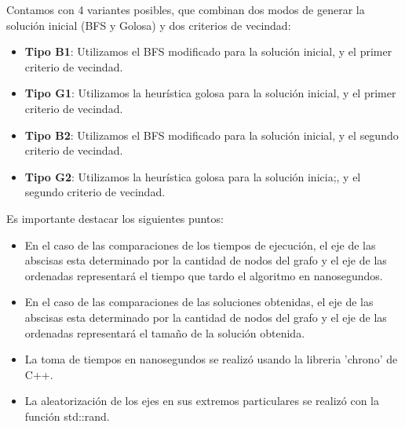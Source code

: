 Contamos con 4 variantes posibles, que combinan dos modos de generar la solución inicial (BFS y Golosa) y dos criterios de vecindad:

\begin{itemize}
	\item \textbf{Tipo B1}: Utilizamos el BFS modificado para la solución inicial, y el primer criterio de vecindad.
    \item \textbf{Tipo G1}: Utilizamos la heurística golosa para la solución inicial, y el primer criterio de vecindad.
    \item \textbf{Tipo B2}: Utilizamos el BFS modificado para la solución inicial, y el segundo criterio de vecindad.
    \item \textbf{Tipo G2}: Utilizamos la heurística golosa para la solución inicia;, y el segundo criterio de vecindad.
\end{itemize}

Es importante destacar los siguientes puntos:

\begin{itemize}
	\item En el caso de las comparaciones de los tiempos de ejecución, el eje de las abscisas esta determinado por la cantidad de nodos del grafo y el eje de las ordenadas representará el tiempo que tardo el algoritmo en nanosegundos.
	\item En el caso de las comparaciones de las soluciones obtenidas, el eje de las abscisas esta determinado por la cantidad de nodos del grafo y el eje de las ordenadas representará el tamaño de la solución obtenida.
	\item La toma de tiempos en nanosegundos se realizó usando la libreria 'chrono' de C++.
	\item La aleatorización de los ejes en sus extremos particulares se realizó con la función std::rand.
\end{itemize}

